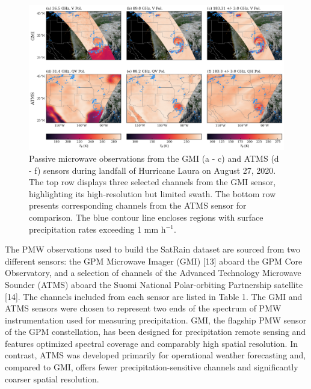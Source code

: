 \documentclass[11pt]{article}
\begin{document}
\begin{figure}[htbp] %
	\centering
	\includegraphics[width=1.0\textwidth]{figures/fig02}
	\caption{
		Passive microwave observations from the GMI (a - c) and ATMS (d - f) sensors during landfall of Hurricane Laura on August 27, 2020. The top row displays three selected channels from the GMI sensor, highlighting its high-resolution but limited swath. The bottom row presents corresponding channels from the ATMS sensor for comparison. The blue contour line encloses regions with surface precipitation rates exceeding 1 mm h$^{-1}$.
	}
	\label{fig:observations_pmw}
\end{figure}


The PMW observations used to build the SatRain dataset are sourced from two
different sensors: the GPM Microwave Imager (GMI) [13] aboard the GPM Core
Observatory, and a selection of channels of the Advanced Technology Microwave
Sounder (ATMS) aboard the Suomi National Polar-orbiting Partnership satellite
	[14]. The channels included from each sensor are listed in Table 1. The GMI and
ATMS sensors were chosen to represent two ends of the spectrum of PMW
instrumentation used for measuring precipitation. GMI, the flagship PMW sensor
of the GPM constellation, has been designed for precipitation remote sensing and
features optimized spectral coverage and comparably high spatial resolution. In
contrast, ATMS was developed primarily for operational weather forecasting and,
compared to GMI, offers fewer precipitation-sensitive channels and significantly
coarser spatial resolution.
\end{document}
